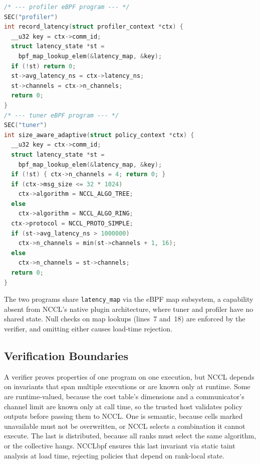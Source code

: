\documentclass[sigplan,10pt]{acmart}
\newcommand{\sysname}{NCCLbpf\xspace}
\begin{document}
\begin{lstlisting}[language=C, caption={Profiler-to-tuner closed loop. The
  profiler (top) writes latency into a shared map the tuner (bottom)
  reads; the verifier enforces the null checks (lines 7, 18).},
  label={lst:policy}, basicstyle=\ttfamily\scriptsize]
/* --- profiler eBPF program --- */
SEC("profiler")
int record_latency(struct profiler_context *ctx) {
  __u32 key = ctx->comm_id;
  struct latency_state *st =
    bpf_map_lookup_elem(&latency_map, &key);
  if (!st) return 0;
  st->avg_latency_ns = ctx->latency_ns;
  st->channels = ctx->n_channels;
  return 0;
}
/* --- tuner eBPF program --- */
SEC("tuner")
int size_aware_adaptive(struct policy_context *ctx) {
  __u32 key = ctx->comm_id;
  struct latency_state *st =
    bpf_map_lookup_elem(&latency_map, &key);
  if (!st) { ctx->n_channels = 4; return 0; }
  if (ctx->msg_size <= 32 * 1024)
    ctx->algorithm = NCCL_ALGO_TREE;
  else
    ctx->algorithm = NCCL_ALGO_RING;
  ctx->protocol = NCCL_PROTO_SIMPLE;
  if (st->avg_latency_ns > 1000000)
    ctx->n_channels = min(st->channels + 1, 16);
  else
    ctx->n_channels = st->channels;
  return 0;
}
\end{lstlisting}

The two programs share \texttt{latency\_map} via the eBPF map
subsystem, a capability absent from NCCL's native plugin
architecture, where tuner and profiler have no shared state.
Null checks on map lookups (lines~7 and~18) are enforced by the
verifier, and omitting either causes load-time rejection.


\subsection{Verification Boundaries}
\label{sec:invariants}

A verifier proves properties of one program on one execution, but
NCCL depends on invariants that span multiple executions or are known
only at runtime. Some are runtime-valued, because the cost table's dimensions
and a communicator's channel limit are known only at call time, so the
trusted host validates policy outputs before passing them to NCCL.
One is semantic, because cells marked unavailable must not be overwritten, or
NCCL selects a combination it cannot execute. The last is distributed,
because all ranks must select the same algorithm, or the collective hangs.
\sysname{} ensures this last invariant via static taint analysis at
load time, rejecting policies that depend on rank-local state.
\end{document}
